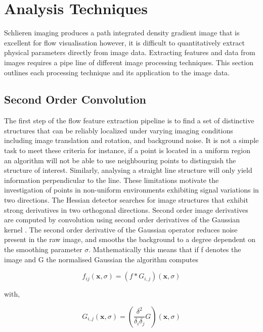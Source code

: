 \newpage

\section{Analysis Techniques} \label{sect:post}

Schlieren imaging produces a path integrated density gradient image that is excellent for flow visualisation however, it is difficult to quantitatively extract physical parameters directly from image data. Extracting features and data from images requires a pipe line of different image processing techniques. This section outlines each processing technique and its application to the image data.

\subsection{Second Order Convolution}
The first step of the flow feature extraction pipeline is to find a set of distinctive
structures that can be reliably localized under varying imaging conditions including image translation and rotation, and background noise. It is not a simple task to meet these criteria for instance, if a point is located in a uniform region an algorithm will not be able to use neighbouring points to distinguish the structure of interest. Similarly, analysing a straight line structure will only yield information perpendicular to the line. These limitations motivate the investigation of points in non-uniform environments exhibiting signal variations in two directions. The Hessian detector \citep{beaudet1978rotationally} searches for image structures that exhibit strong derivatives in two orthogonal directions. Second order image derivatives are computed by convolution using second order derivatives of the Gaussian kernel \citep{lindeberg1994linear}. The second order derivative of the Gaussian operator reduces  noise present in the raw image, and smooths the background to a degree dependent on the smoothing parameter $\sigma$. Mathematically this means that if f denotes the image and G the normalised Gaussian the algorithm computes

\begin{equation}
f_{ij}(\textbf{x},\sigma) = (f*G_{i,j})(\textbf{x},\sigma)
\end{equation}

with,

\begin{equation}
G_{i,j}(\textbf{x},\sigma)=\left(\frac{\delta^2}{\delta_i\delta_j}G\right)(\textbf{x},\sigma)
\end{equation}


